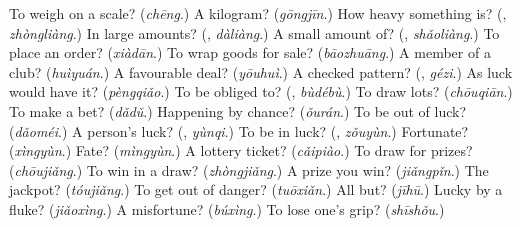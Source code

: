 \begin{tcolorbox}[breakable,colback=teal!4,colframe=teal!35!black,title={Before you move on}]
To weigh on a scale? (\emph{chēng}.) A kilogram? (\emph{gōngjīn}.) How heavy something is? (\textbf{}, \emph{zhòngliàng}.) In large amounts? (\textbf{}, \emph{dàliàng}.) A small amount of? (\textbf{}, \emph{shǎoliàng}.) To place an order? (\emph{xiàdān}.) To wrap goods for sale? (\emph{bāozhuāng}.) A member of a club? (\emph{huìyuán}.) A favourable deal? (\emph{yōuhuì}.) A checked pattern? (\textbf{}, \emph{gézi}.) As luck would have it? (\emph{pèngqiǎo}.) To be obliged to? (\textbf{}, \emph{bùdébù}.) To draw lots? (\emph{chōuqiān}.) To make a bet? (\emph{dǎdǔ}.) Happening by chance? (\emph{ǒurán}.) To be out of luck? (\emph{dǎoméi}.) A person's luck? (\textbf{}, \emph{yùnqi}.) To be in luck? (\textbf{}, \emph{zǒuyùn}.) Fortunate? (\emph{xìngyùn}.) Fate? (\emph{mìngyùn}.) A lottery ticket? (\emph{cǎipiào}.) To draw for prizes? (\emph{chōujiǎng}.) To win in a draw? (\emph{zhòngjiǎng}.) A prize you win? (\emph{jiǎngpǐn}.) The jackpot? (\emph{tóujiǎng}.) To get out of danger? (\emph{tuōxiǎn}.) All but? (\emph{jīhū}.) Lucky by a fluke? (\emph{jiǎoxìng}.) A misfortune? (\emph{búxìng}.) To lose one's grip? (\emph{shīshǒu}.)
\end{tcolorbox}
